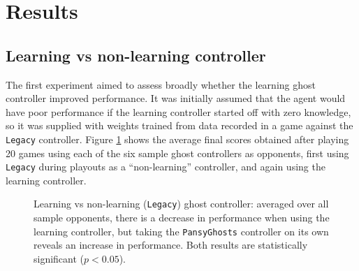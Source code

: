 \section{Results}
\label{sec:results}

\subsection{Learning vs non-learning controller}

The first experiment aimed to assess broadly whether the learning ghost controller improved performance.  It was initially assumed that the agent would have poor performance if the learning controller started off with zero knowledge, so it was supplied with weights trained from data recorded in a game against the {\tt Legacy} controller.  Figure \ref{fig:results1} shows the average final scores obtained after playing 20 games using each of the six sample ghost controllers as opponents, first using {\tt Legacy} during playouts as a ``non-learning'' controller, and again using the learning controller.

\begin{figure}
\centering
{}
\caption[Learning vs non-learning ({\tt Legacy}) ghost controller]{Learning vs non-learning ({\tt Legacy}) ghost controller: averaged over all sample opponents, there is a decrease in performance when using the learning controller, but taking the {\tt PansyGhosts} controller on its own reveals an increase in performance.  Both results are statistically significant ($p < 0.05$).}
\label{fig:results1}
\end{figure}

